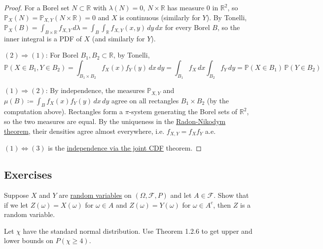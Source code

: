 	\begin{proof}
		For a Borel set $N \subset \mathbb{R}$ with $\lambda(N) = 0$, $N \times \mathbb{R}$ has measure $0$ in $\mathbb{R}^2$, so $\mathbb{P}_X (N) = \mathbb{P}_{X, Y} (N \times \mathbb{R}) = 0$ and $X$ is continuous (similarly for $Y$). By Tonelli, $\mathbb{P}_X (B) = \int_{B \times \mathbb{R}} f_{X, Y} \,d\lambda = \int_B \int_{\mathbb{R}} f_{X, Y} (x, y) \,dy\,dx$ for every Borel $B$, so the inner integral is a PDF of $X$ (and similarly for $Y$). 

		$(2) \Rightarrow (1)$: For Borel $B_1, B_2 \subset \mathbb{R}$, by Tonelli, 
		\begin{equation}
			\mathbb{P}(X \in B_1, Y \in B_2) = \int_{B_1 \times B_2} f_X (x) f_Y (y) \,dx\,dy = \int_{B_1} f_X \,dx \int_{B_2} f_Y \,dy = \mathbb{P}(X \in B_1) \, \mathbb{P}(Y \in B_2)
		\end{equation}

		$(1) \Rightarrow (2)$: By independence, the measures $\mathbb{P}_{X, Y}$ and $\mu(B) \coloneqq \int_B f_X (x) f_Y (y) \,dx\,dy$ agree on all rectangles $B_1 \times B_2$ (by the computation above). Rectangles form a $\pi$-system generating the Borel sets of $\mathbb{R}^2$, so the two measures are equal. By the uniqueness in the \hyperref[mt-thm:rn-der]{Radon-Nikodym theorem}, their densities agree almost everywhere, i.e. $f_{X, Y} = f_X f_Y$ a.e. 

		$(1) \Leftrightarrow (3)$ is the \hyperref[thm:independence-via-the-joint-cdf]{independence via the joint CDF} theorem. 
	\end{proof}

\subsection{Exercises}

  \begin{exercise}[Durrett 1.2.1]
    Suppose $X$ and $Y$ are \hyperref[def:random-variable]{random variables} on $(\Omega, \mathcal{F}, P)$ and let $A \in \mathcal{F}$. Show that if we let $Z(\omega) = X(\omega)$ for $\omega \in A$ and $Z(\omega) = Y(\omega)$ for $\omega \in A^c$, then $Z$ is a random variable.
  \end{exercise}
  \begin{solution}
    
  \end{solution}

  \begin{exercise}[Durrett 1.2.2]
    Let $\chi$ have the standard normal distribution. Use Theorem 1.2.6 to get upper and lower bounds on $P(\chi \geq 4)$.
  \end{exercise}
  \begin{solution}
    
  \end{solution}


